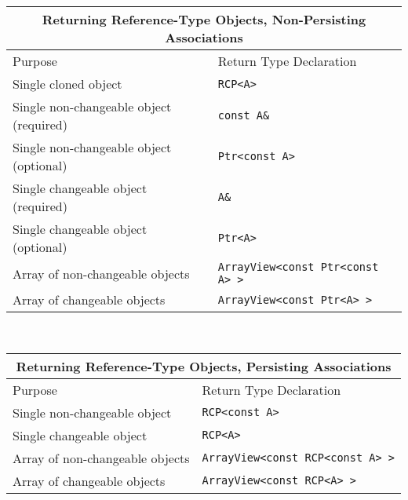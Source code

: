 \begin{tabular}{|l|l|}
%
\multicolumn{2}{c}{\textbf{Returning Reference-Type Objects, Non-Persisting Associations}} \\
%
\hline
Purpose
& Return Type Declaration \\
\hline
\hline
Single cloned object
& {}\texttt{RCP<A>} \\
\hline
Single non-changeable object (required)
& {}\texttt{const A\&} \\
\hline
Single non-changeable object (optional)
& {}\texttt{Ptr<const A>} \\
\hline
Single changeable object (required)
& {}\texttt{A\&} \\
\hline
Single changeable object (optional)
& {}\texttt{Ptr<A>} \\
\hline
Array of non-changeable objects
& {}\texttt{ArrayView<const Ptr<const A> >} \\
\hline
Array of changeable objects
& {}\texttt{ArrayView<const Ptr<A> >} \\
\hline
%
\end{tabular} \\[3ex]
%
\begin{tabular}{|l|l|}
%
\multicolumn{2}{c}{\textbf{Returning Reference-Type Objects, Persisting Associations}} \\
%
\hline
Purpose
& Return Type Declaration \\
\hline
\hline
Single non-changeable object
& {}\texttt{RCP<const A>} \\
\hline
Single changeable object
& {}\texttt{RCP<A>} \\
\hline
Array of non-changeable objects
& {}\texttt{ArrayView<const RCP<const A> >} \\
\hline
Array of changeable objects
& {}\texttt{ArrayView<const RCP<A> >} \\
\hline
\end{tabular}
